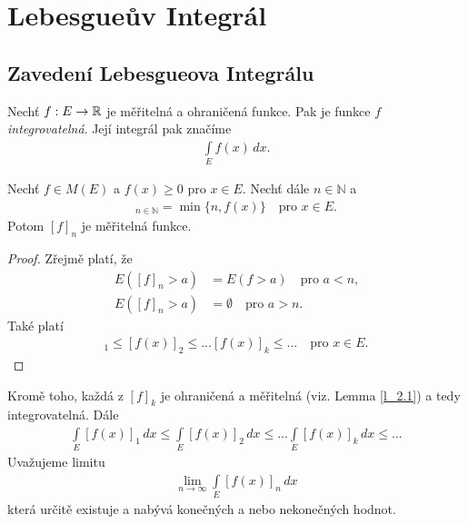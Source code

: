 

\chapter{Lebesgueův Integrál}
\section{Zavedení Lebesgueova Integrálu}

\begin{definition}
Nechť $f:E \to \mathbb{R}$ je měřitelná a ohraničená funkce. Pak je funkce $f$ \textit{integrovatelná}. Její integrál pak značíme
\begin{align*}
\int \limits _{E} f(x) \, dx.
\end{align*}
\end{definition}

\begin{lemma}
Nechť $f \in M(E)$ a $f(x) \geq 0$ pro $x \in E$. Nechť dále $n \in \mathbb{N}$ a 
\begin{align*}
[f(x)]_{n \in \mathbb{N}}=\min\{n,f(x)\} \quad \text{pro $x \in E$.}
\end{align*}
Potom $[f]_n$  je měřitelná funkce.
\label{l_2.1}
\end{lemma}

\begin{proof}
Zřejmě platí, že
\begin{align*}
E([f]_n>a)&  = E(f>a) \quad \text{pro $a<n$,} \\
E([f]_n>a)&=\emptyset \quad \text{pro $a>n$.}
\end{align*}
Také platí
\begin{align*}
[f(x)]_1 \leq [f(x)]_2 \leq ... [f(x)]_k \leq ... \quad \text{pro $x \in E$.}
\end{align*}
\end{proof}
Kromě toho, každá z $[f]_k$ je ohraničená a měřitelná (viz. Lemma \ref{l_2.1}) a tedy integrovatelná. Dále 
\begin{align*}
\int \limits _E [f(x)]_1 \, dx \leq \int \limits _E [f(x)]_2 \, dx \leq ...\int \limits _E  [f(x)]_k  \, dx  \leq ...
\end{align*}
Uvažujeme limitu 
\begin{align}
\lim \limits _{n \to \infty} \int \limits _E  [f(x)]_n \, dx
\label{vztah_2.1}
\end{align}
která určitě existuje a nabývá konečných a nebo nekonečných hodnot.








